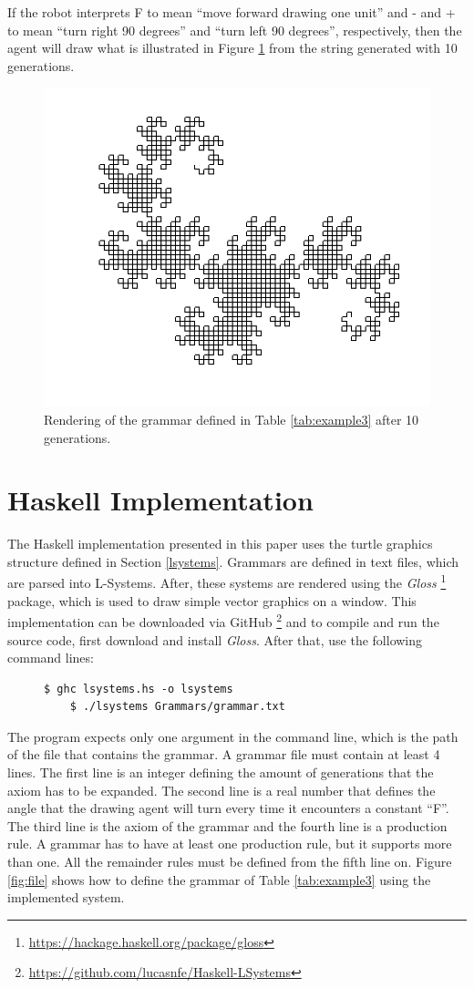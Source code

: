 \documentclass{article}
\begin{document}
If the robot interprets F to mean ``move forward drawing one unit'' and - and + to
mean ``turn right 90 degrees'' and ``turn left 90 degrees'', respectively, then the agent will
draw what is illustrated in Figure \ref{fig:rendered} from the string generated
with 10 generations.

\begin{figure}[!h]
\centering
\includegraphics[width=0.48 \textwidth]{Images/result4.png}
\vskip -6pt
\caption{Rendering of the grammar defined in Table \ref{tab:example3} after 10 generations.}
\label{fig:rendered}
\end{figure}

\section{Haskell Implementation}
\label{implementation}

The Haskell implementation presented in this paper uses the turtle graphics
structure defined in Section \ref{lsystems}. Grammars are defined in text files,
which are parsed into L-Systems. After, these systems are rendered using the \textit{Gloss}
\footnote{\url{https://hackage.haskell.org/package/gloss}} package, which is used to draw
simple vector graphics on a window. This implementation can be downloaded via GitHub
\footnote{\url{https://github.com/lucasnfe/Haskell-LSystems}} and to compile and run the
source code, first download and install \textit{Gloss}. After that, use the following command lines:

\begin{figure}[!h]
\centering
\begin{lstlisting}[style=BashStyle]
    $ ghc lsystems.hs -o lsystems
    $ ./lsystems Grammars/grammar.txt
\end{lstlisting}
\vskip -6pt
\end{figure}

The program expects only one argument in the command line, which is the path of
the file that contains the grammar. A grammar file must contain at least 4 lines.
The first line is an integer defining the amount of generations that the axiom
has to be expanded. The second line is a real number that defines the angle that
the drawing agent will turn every time it encounters a constant ``F''. The third
line is the axiom of the grammar and the fourth line is a production rule. A grammar
has to have at least one production rule, but it supports more than one. All the
remainder rules must be defined from the fifth line on. Figure \ref{fig:file} shows how
to define the grammar of Table \ref{tab:example3} using the implemented system.
\end{document}
